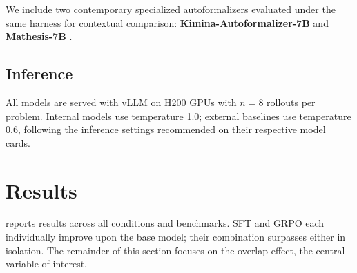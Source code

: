 \documentclass[11pt,a4paper]{article}
\begin{document}
We include two contemporary specialized autoformalizers evaluated under the same harness for contextual comparison: \textbf{Kimina-Autoformalizer-7B} \citep{wang2025kimina} and \textbf{Mathesis-7B} \citep{zhang2025mathesis}.

\subsection{Inference}\label{sec:inference}

All models are served with vLLM on H200 GPUs with $n{=}8$ rollouts per problem. Internal models use temperature 1.0; external baselines use temperature 0.6, following the inference settings recommended on their respective model cards.


\section{Results}\label{sec:results}

 reports results across all conditions and benchmarks. SFT and GRPO each individually improve upon the base model; their combination surpasses either in isolation. The remainder of this section focuses on the overlap effect, the central variable of interest.
\end{document}

